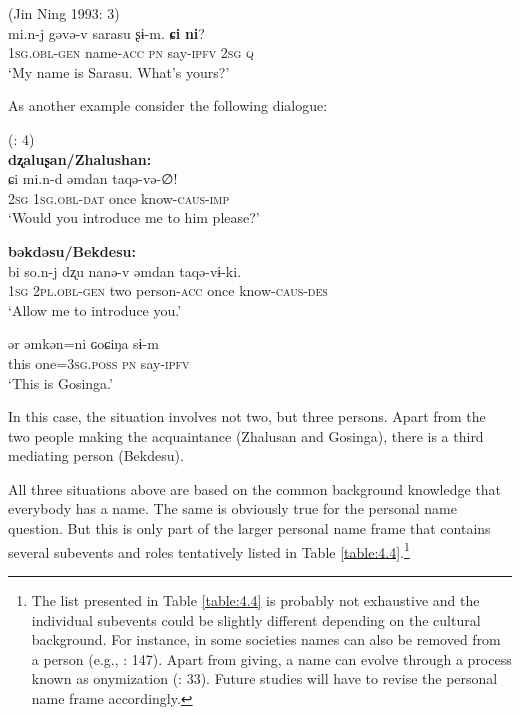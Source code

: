 \documentclass[output=paper,colorlinks,citecolor=brown]{langscibook}
\begin{document}
\ea
    \label{example4.52}
     (Jin Ning 1993: 3)\\
    \gll mi.n-j		gəvə-v		sarasu	ʂɨ-m.	\textbf{ɕi}	\textbf{ni}?\\
    1\textsc{sg.obl-gen}	name-\textsc{acc}		\textsc{pn}		say-\textsc{ipfv}	2\textsc{sg}	\textsc{q}\\
    \glt ‘My name is Sarasu. What’s yours?’
    \z

\noindent As another example consider the following dialogue:

\ea
    \label{example4.53}
     (\citealt{Jin1993}: 4)\\
    \ea
    \textbf{dʐaluʂan/Zhalushan:}\\
    \gll ɕi		mi.n-d			əmdan	taqə-və-∅!\\
    2\textsc{sg}		1\textsc{sg.obl-dat}		once		know-\textsc{caus-imp}\\
    \glt ‘Would you introduce me to him please?’

    \ex
    \textbf{bəkdəsu/Bekdesu:}\\
    \gll bi		so.n-j			dʐu		nanə-v		əmdan	taqə-vɨ-ki.\\
    1\textsc{sg}		2\textsc{pl.obl-gen}		two		person-\textsc{acc}	once	know-\textsc{caus-des}\\
    \glt ‘Allow me to introduce you.’

    \ex
    \gll ər	əmkən=ni		ɢoɕiŋa	sɨ-m			{\normalfont [...]}\\
    this	one=3\textsc{sg.poss}		\textsc{pn}		say-\textsc{ipfv}\\
    \glt ‘This is Gosinga.’
    \z
\z

In this case, the situation involves not two, but three persons. Apart from the two people making the acquaintance (Zhalusan and Gosinga), there is a third mediating person (Bekdesu).

All three situations above are based on the common background knowledge that everybody has a name. The same is obviously true for the personal name question. But this is only part of the larger personal name frame that contains several subevents and roles tentatively listed in Table \ref{table:4.4}.\footnote{The list presented in Table \ref{table:4.4} is probably not exhaustive and the individual subevents could be slightly different depending on the cultural background. For instance, in some societies names can also be removed from a person (e.g., \citealt{Moutu2013}: 147). Apart from giving, a name can evolve through a process known as onymization (\citealt{VanLangendonck2016}: 33). Future studies will have to revise the personal name frame accordingly.}
\end{document}
